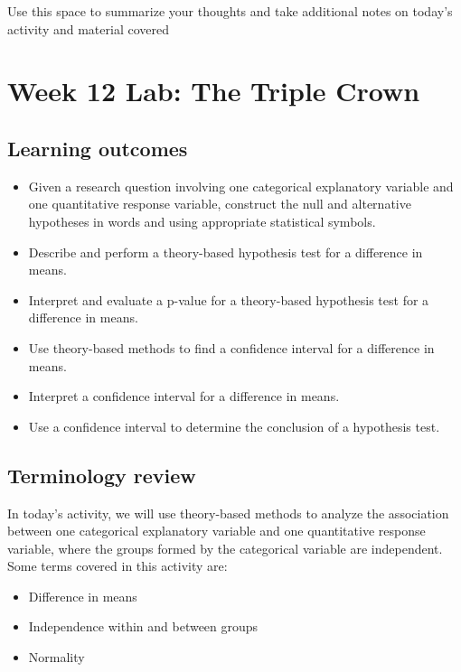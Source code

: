 \documentclass[
]{report}
\begin{document}
Use this space to summarize your thoughts and take additional notes on today's activity and material covered

\newpage

\hypertarget{week-12-lab-the-triple-crown}{%
\section{Week 12 Lab: The Triple Crown}\label{week-12-lab-the-triple-crown}}


\hypertarget{learning-outcomes-24}{%
\subsection{Learning outcomes}\label{learning-outcomes-24}}

\begin{itemize}
\item
  Given a research question involving one categorical explanatory variable and one quantitative response variable, construct the null and alternative hypotheses
  in words and using appropriate statistical symbols.
\item
  Describe and perform a theory-based hypothesis test for a difference in means.
\item
  Interpret and evaluate a p-value for a theory-based hypothesis test for a difference in means.
\item
  Use theory-based methods to find a confidence interval for a difference in means.
\item
  Interpret a confidence interval for a difference in means.
\item
  Use a confidence interval to determine the conclusion of a hypothesis test.
\end{itemize}

\hypertarget{terminology-review-20}{%
\subsection{Terminology review}\label{terminology-review-20}}

In today's activity, we will use theory-based methods to analyze the association between one categorical explanatory variable and one quantitative response variable, where the groups formed by the categorical variable are independent. Some terms covered in this activity are:

\begin{itemize}
\item
  Difference in means
\item
  Independence within and between groups
\item
  Normality
\end{itemize}
\end{document}
